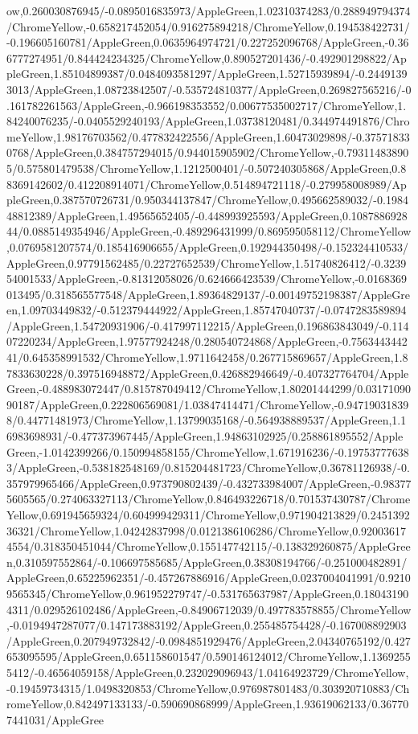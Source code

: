 {\begin{tikzternal}
ow,0.260030876945/-0.0895016835973/AppleGreen,1.02310374283/0.288949794374/ChromeYellow,-0.658217452054/0.916275894218/ChromeYellow,0.194538422731/-0.196605160781/AppleGreen,0.0635964974721/0.227252096768/AppleGreen,-0.366777274951/0.844424234325/ChromeYellow,0.890527201436/-0.492901298822/AppleGreen,1.85104899387/0.0484093581297/AppleGreen,1.52715939894/-0.24491393013/AppleGreen,1.08723842507/-0.535724810377/AppleGreen,0.269827565216/-0.161782261563/AppleGreen,-0.966198353552/0.00677535002717/ChromeYellow,1.84240076235/-0.0405529240193/AppleGreen,1.03738120481/0.344974491876/ChromeYellow,1.98176703562/0.477832422556/AppleGreen,1.60473029898/-0.375718330768/AppleGreen,0.384757294015/0.944015905902/ChromeYellow,-0.793114838905/0.575801479538/ChromeYellow,1.1212500401/-0.507240305868/AppleGreen,0.88369142602/0.412208914071/ChromeYellow,0.514894721118/-0.279958008989/AppleGreen,0.387570726731/0.950344137847/ChromeYellow,0.495662589032/-0.198448812389/AppleGreen,1.49565652405/-0.448993925593/AppleGreen,0.108788692844/0.0885149354946/AppleGreen,-0.489296431999/0.869595058112/ChromeYellow,0.0769581207574/0.185416906655/AppleGreen,0.192944350498/-0.152324410533/AppleGreen,0.97791562485/0.22727652539/ChromeYellow,1.51740826412/-0.323954001533/AppleGreen,-0.81312058026/0.624666423539/ChromeYellow,-0.0168369013495/0.318565577548/AppleGreen,1.89364829137/-0.00149752198387/AppleGreen,1.09703449832/-0.512379444922/AppleGreen,1.85747040737/-0.0747283589894/AppleGreen,1.54720931906/-0.417997112215/AppleGreen,0.196863843049/-0.11407220234/AppleGreen,1.97577924248/0.280540724868/AppleGreen,-0.756344344241/0.645358991532/ChromeYellow,1.9711642458/0.267715869657/AppleGreen,1.87833630228/0.397516948872/AppleGreen,0.426882946649/-0.407327764704/AppleGreen,-0.488983072447/0.815787049412/ChromeYellow,1.80201444299/0.0317109090187/AppleGreen,0.222806569081/1.03847414471/ChromeYellow,-0.947190318398/0.44771481973/ChromeYellow,1.13799035168/-0.564938889537/AppleGreen,1.16983698931/-0.477373967445/AppleGreen,1.94863102925/0.258861895552/AppleGreen,-1.0142399266/0.150994858155/ChromeYellow,1.671916236/-0.197537776383/AppleGreen,-0.538182548169/0.815204481723/ChromeYellow,0.36781126938/-0.357979965466/AppleGreen,0.973790802439/-0.432733984007/AppleGreen,-0.983775605565/0.274063327113/ChromeYellow,0.846493226718/0.701537430787/ChromeYellow,0.691945659324/0.604999429311/ChromeYellow,0.971904213829/0.245139236321/ChromeYellow,1.04242837998/0.0121386106286/ChromeYellow,0.920036174554/0.318350451044/ChromeYellow,0.155147742115/-0.138329260875/AppleGreen,0.310597552864/-0.106697585685/AppleGreen,0.38308194766/-0.251000482891/AppleGreen,0.65225962351/-0.457267886916/AppleGreen,0.0237004041991/0.92109565345/ChromeYellow,0.961952279747/-0.531765637987/AppleGreen,0.180431904311/0.029526102486/AppleGreen,-0.84906712039/0.497783578855/ChromeYellow,-0.0194947287077/0.147173883192/AppleGreen,0.255485754428/-0.167008892903/AppleGreen,0.207949732842/-0.0984851929476/AppleGreen,2.04340765192/0.427653095595/AppleGreen,0.651158601547/0.590146124012/ChromeYellow,1.13692555412/-0.46564059158/AppleGreen,0.232029096943/1.04164923729/ChromeYellow,-0.19459734315/1.0498320853/ChromeYellow,0.976987801483/0.303920710883/ChromeYellow,0.842497133133/-0.590690868999/AppleGreen,1.93619062133/0.367707441031/AppleGree
\end{tikzternal}}
